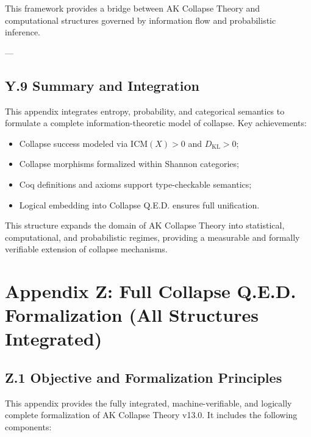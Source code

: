 \documentclass[11pt]{article}
\begin{document}
This framework provides a bridge between AK Collapse Theory and computational structures governed by information flow and probabilistic inference.

---

\subsection*{Y.9 Summary and Integration}

This appendix integrates entropy, probability, and categorical semantics to formulate a complete information-theoretic model of collapse. Key achievements:

\begin{itemize}
    \item Collapse success modeled via \( \mathrm{ICM}(X) > 0 \) and \( D_{\mathrm{KL}} > 0 \);
    \item Collapse morphisms formalized within Shannon categories;
    \item Coq definitions and axioms support type-checkable semantics;
    \item Logical embedding into Collapse Q.E.D. ensures full unification.
\end{itemize}

This structure expands the domain of AK Collapse Theory into statistical, computational, and probabilistic regimes, providing a measurable and formally verifiable extension of collapse mechanisms.


\section*{Appendix Z: Full Collapse Q.E.D. Formalization (All Structures Integrated)}

\subsection*{Z.1 Objective and Formalization Principles}

This appendix provides the fully integrated, machine-verifiable, and logically complete formalization of AK Collapse Theory v13.0. It includes the following components:
\end{document}

